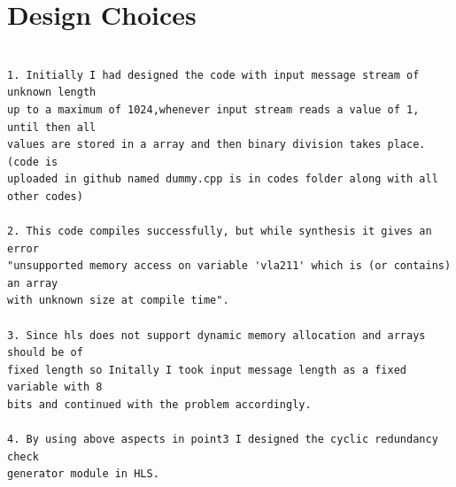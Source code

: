 \documentclass{article}
\begin{document}
\section{Design Choices}
\begin{lstlisting}

1. Initially I had designed the code with input message stream of unknown length 
up to a maximum of 1024,whenever input stream reads a value of 1, until then all
values are stored in a array and then binary division takes place.(code is 
uploaded in github named dummy.cpp is in codes folder along with all other codes)

2. This code compiles successfully, but while synthesis it gives an error
"unsupported memory access on variable 'vla211' which is (or contains) an array
with unknown size at compile time".

3. Since hls does not support dynamic memory allocation and arrays should be of
fixed length so Initally I took input message length as a fixed variable with 8
bits and continued with the problem accordingly.

4. By using above aspects in point3 I designed the cyclic redundancy check
generator module in HLS.

\end{lstlisting}
\vspace{1cm}
\end{document}
